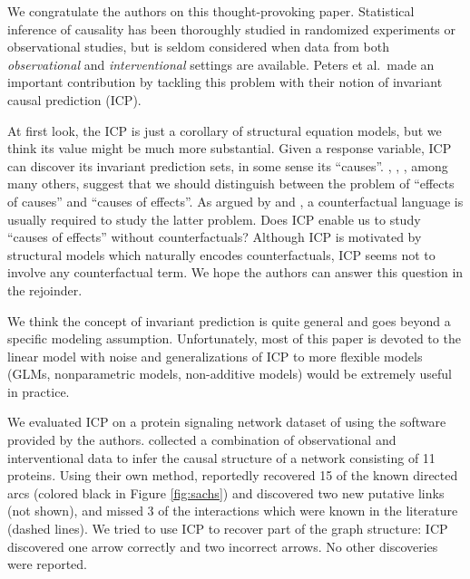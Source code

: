 \documentclass{article}
\begin{document}
\maketitle

\newcommand{\tr}{\text{tr}}
\newcommand{\E}{\textbf{E}}
\newcommand{\diag}{\text{diag}}
\newcommand{\argmax}{\text{argmax}}
\newcommand{\Cov}{\text{Cov}}
\newcommand{\Var}{\text{Var}}
\newcommand{\argmin}{\text{argmin}}
\newcommand{\Vol}{\text{Vol}}
\newcommand{\comm}[1]{}

We congratulate the authors on this thought-provoking
paper. Statistical inference of causality has been thoroughly studied
in randomized experiments or observational studies, but is seldom
considered when data from both \emph{observational}
and \emph{interventional} settings are available. Peters et
al.\ made an important contribution by tackling this problem with
their notion of invariant causal prediction (ICP).

At first look, the ICP is just a corollary of structural
equation models, but we think its value might be much more
substantial. Given a response variable, ICP can discover its invariant
prediction sets, in some sense its
``causes''. \citet{holland1986statistics}, \citet{dawid2000causal},
\citet{pearl2000causality}, among many others, suggest that we should
distinguish between the problem of ``effects of causes'' and ``causes
of effects''. As argued by \citet{robins2000causal} and
\citet{pearl2000causality}, a counterfactual language is usually
required to study the latter problem. Does ICP enable us to study
``causes of effects'' without counterfactuals? Although ICP is
motivated by structural models which naturally encodes
counterfactuals, ICP seems not to involve any counterfactual term. We
hope the authors can answer this question in the rejoinder.

We think the concept of invariant prediction is quite
general and goes beyond a specific modeling assumption. Unfortunately,
most of this paper is devoted to the linear model with noise and
generalizations of ICP to more flexible models (GLMs,
nonparametric models, non-additive models) would be extremely useful
in practice.

We evaluated ICP on a protein signaling network dataset of
\citet{sachs2005causal} using the software provided by the authors.
\citet{sachs2005causal} collected a
combination of observational and interventional data to infer the
causal structure of a network consisting of 11 proteins.  Using their
own method, \citet{sachs2005causal} reportedly recovered 15 of the
known directed arcs (colored black in Figure \ref{fig:sachs}) and
discovered two new putative links (not shown), and missed 3 of the
interactions which were known in the literature (dashed lines). We
tried to use ICP to recover part of the graph structure: ICP
discovered one arrow correctly and two incorrect arrows. No other
discoveries were reported.
\end{document}

